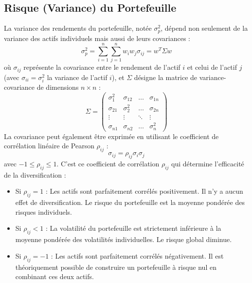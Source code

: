 \subsection{Risque (Variance) du Portefeuille}
La variance des rendements du portefeuille, notée $\sigma_p^2$, dépend non seulement de la variance des actifs individuels mais aussi de leurs covariances :
\begin{equation}
    \sigma_p^2 = \sum_{i=1}^{n} \sum_{j=1}^{n} w_i w_j \sigma_{ij} = w^T \Sigma w
\end{equation}
où $\sigma_{ij}$ représente la covariance entre le rendement de l'actif $i$ et celui de l'actif $j$ (avec $\sigma_{ii} = \sigma_i^2$ la variance de l'actif $i$), et $\Sigma$ désigne la matrice de variance-covariance de dimensions $n \times n$ :
\begin{equation}
    \Sigma = \begin{pmatrix}
        \sigma_1^2 & \sigma_{12} & \dots & \sigma_{1n} \\
        \sigma_{21} & \sigma_2^2 & \dots & \sigma_{2n} \\
        \vdots & \vdots & \ddots & \vdots \\
        \sigma_{n1} & \sigma_{n2} & \dots & \sigma_n^2
    \end{pmatrix}
\end{equation}
La covariance peut également être exprimée en utilisant le coefficient de corrélation linéaire de Pearson $\rho_{ij}$ :
\begin{equation}
    \sigma_{ij} = \rho_{ij} \sigma_i \sigma_j
\end{equation}
avec $-1 \le \rho_{ij} \le 1$. C'est ce coefficient de corrélation $\rho_{ij}$ qui détermine l'efficacité de la diversification :
\begin{itemize}
    \item Si $\rho_{ij} = 1$ : Les actifs sont parfaitement corrélés positivement. Il n'y a aucun effet de diversification. Le risque du portefeuille est la moyenne pondérée des risques individuels.
    \item Si $\rho_{ij} < 1$ : La volatilité du portefeuille est strictement inférieure à la moyenne pondérée des volatilités individuelles. Le risque global diminue.
    \item Si $\rho_{ij} = -1$ : Les actifs sont parfaitement corrélés négativement. Il est théoriquement possible de construire un portefeuille à risque nul en combinant ces deux actifs.
\end{itemize}

